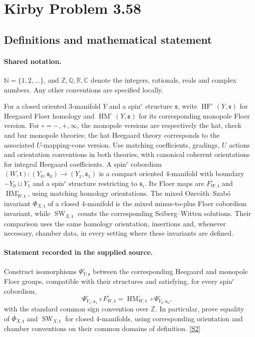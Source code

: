 \documentclass[11pt]{article}
\newcommand{\sref}[2]{\hyperlink{source:#1:#2}{[S#2]}}
\begin{document}
\section{Kirby Problem 3.58}\label{statement}

\subsection{Definitions and mathematical statement}

\paragraph{Shared notation.}$\mathbb N=\{1,2,\ldots\}$, and $\mathbb Z,\mathbb Q,\mathbb R,\mathbb C$ denote the integers, rationals, reals and complex numbers. Any other conventions are specified locally.


For a closed oriented $3$-manifold $Y$ and a spin$^c$ structure $\mathfrak s$, write $\operatorname{HF}^{\circ}(Y,\mathfrak s)$ for Heegaard Floer homology and $\operatorname{HM}^{\circ}(Y,\mathfrak s)$ for its corresponding monopole Floer version. For $\circ=-,+,\infty$, the monopole versions are respectively the hat, check and bar monopole theories; the hat Heegaard theory corresponds to the associated $U$-mapping-cone version. Use matching coefficients, gradings, $U$ actions and orientation conventions in both theories, with canonical coherent orientations for integral Heegaard coefficients.
A spin$^c$ cobordism $(W,\mathfrak t):(Y_0,\mathfrak s_0)\to(Y_1,\mathfrak s_1)$ is a compact oriented $4$-manifold with boundary $-Y_0\sqcup Y_1$ and a spin$^c$ structure restricting to $\mathfrak s_i$. Its Floer maps are $F^{\circ}_{W,\mathfrak t}$ and $\operatorname{HM}^{\circ}_{W,\mathfrak t}$, using matching homology orientations. The mixed Ozsv\'ath--Szab\'o invariant $\Phi_{X,\mathfrak t}$ of a closed $4$-manifold is the mixed minus-to-plus Floer cobordism invariant, while $\operatorname{SW}_{X,\mathfrak t}$ counts the corresponding Seiberg--Witten solutions. Their comparison uses the same homology orientation, insertions and, whenever necessary, chamber data, in every setting where these invariants are defined.
\paragraph{Statement recorded in the supplied source.}
Construct isomorphisms $\Psi^{\circ}_{Y,\mathfrak s}$ between the corresponding Heegaard and monopole Floer groups, compatible with their structures and satisfying, for every spin$^c$ cobordism,
\[
\Psi^{\circ}_{Y_1,\mathfrak s_1}\circ F^{\circ}_{W,\mathfrak t}
=\operatorname{HM}^{\circ}_{W,\mathfrak t}\circ\Psi^{\circ}_{Y_0,\mathfrak s_0},
\]
with the standard common sign convention over $\mathbb Z$. In particular, prove equality of $\Phi_{X,\mathfrak t}$ and $\operatorname{SW}_{X,\mathfrak t}$ for closed $4$-manifolds, using corresponding orientation and chamber conventions on their common domains of definition. \sref{statement}{2}
\end{document}
